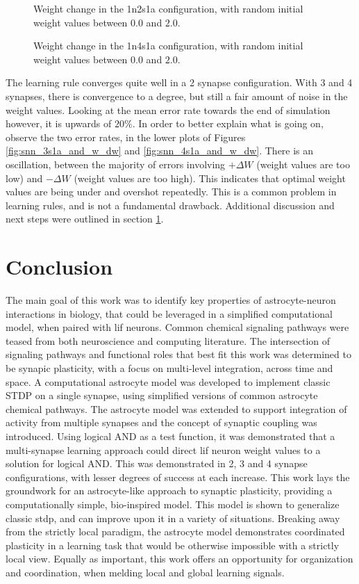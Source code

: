 \documentclass[conference]{IEEEtran}
\newcommand{\asvgf}[4]{
	\begin{figure}[htbp]
    	\centering
		\adjustbox{max width=#4\linewidth}{}
        \caption{#2.}
        \label{#3}
	\end{figure}
}
\begin{document}
\asvgf{figures/artifacts/obj3/snn_2s1a_and_w.svg}{Weight change in the 1n2s1a
  configuration, with random initial weight values between $0.0$ and
  $2.0$}{fig:snn_2s1a_and_w_dw_w}{0.9}

\asvgf{figures/artifacts/obj3/snn_4s1a_and_w.svg}{Weight change in the 1n4s1a
  configuration, with random initial weight values between $0.0$ and
  $2.0$}{fig:snn_4s1a_and_w_dw_w}{0.9}

The learning rule converges quite well in a 2 synapse configuration. With 3 and
4 synapses, there is convergence to a degree, but still a fair amount of noise
in the weight values. Looking at the mean error rate towards the end of
simulation however, it is upwards of $20\%$. In order to better explain what is
going on, observe the two error rates, in the lower plots of Figures
\ref{fig:snn_3s1a_and_w_dw} and \ref{fig:snn_4s1a_and_w_dw}. There is an
oscillation, between the majority of errors involving $+\Delta W$ (weight values
are too low) and $-\Delta W$ (weight values are too high). This indicates that
optimal weight values are being under and overshot repeatedly. This is a common
problem in learning rules, and is not a fundamental drawback. Additional
discussion and next steps were outlined in section \ref{section:conclusion}.


\section{Conclusion} \label{section:conclusion}
The main goal of this work was to identify key properties of astrocyte-neuron
interactions in biology, that could be leveraged in a simplified computational
model, when paired with \gls{lif} neurons. Common chemical signaling pathways
were teased from both neuroscience and computing literature. The intersection of
signaling pathways and functional roles that best fit this work was determined
to be synapic plasticity, with a focus on multi-level integration, across time
and space. A computational astrocyte model was developed to implement classic
STDP on a single synapse, using simplified versions of common astrocyte chemical
pathways. The astrocyte model was extended to support integration of activity
from multiple synapses and the concept of synaptic coupling was
introduced. Using logical AND as a test function, it was demonstrated that a
multi-synapse learning approach could direct \gls{lif} neuron weight values to a
solution for logical AND. This was demonstrated in 2, 3 and 4 synapse
configurations, with lesser degrees of success at each increase. This work lays
the groundwork for an astrocyte-like approach to synaptic plasticity, providing
a computationally simple, bio-inspired model. This model is shown to generalize
classic \gls{stdp}, and can improve upon it in a variety of situations. Breaking
away from the strictly local paradigm, the astrocyte model demonstrates
coordinated plasticity in a learning task that would be otherwise impossible
with a strictly local view. Equally as important, this work offers an
opportunity for organization and coordination, when melding local and global
learning signals.



\printbibliography[heading=bibintoc]
\end{document}
